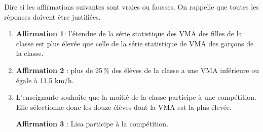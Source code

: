 \documentclass[exercice,a4]{thedocument}%
\begin{document}
\begin{enumerate}
Dire si les affirmations suivantes sont vraies ou fausses. On rappelle que toutes les réponses
doivent être justifiées.

	\begin{enumerate}
		\item \textbf{Affirmation 1}: l'étendue de la série statistique des VMA des filles de la classe est plus élevée que celle de la série statistique de VMA des garçons de la classe.
		\item \textbf{Affirmation 2} : plus de 25\,\% des élèves de la classe a une VMA inférieure ou égale à 11,5 km/h.
		\item L'enseignante souhaite que la moitié de la classe participe à une compétition. Elle sélectionne donc les douze élèves dont la VMA est la plus élevée.

\textbf{Affirmation 3} : Lisa participe à la compétition.
	\end{enumerate}
\end{enumerate}

\bigskip

\showthesource
\end{document}
